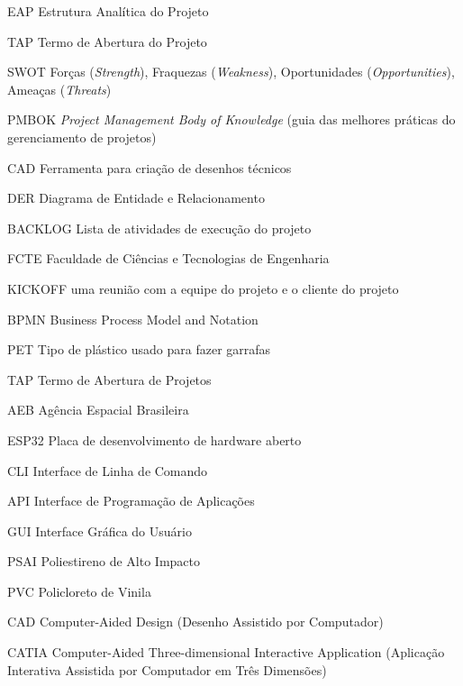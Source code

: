 \begin{siglas}
	\item[EAP] Estrutura Analítica do Projeto
	\item[TAP] Termo de Abertura do Projeto
	\item[SWOT] Forças (\textit{Strength}), Fraquezas (\textit{Weakness}), Oportunidades (\textit{Opportunities}), Ameaças (\textit{Threats})
	\item[PMBOK] \textit{Project Management Body of Knowledge} (guia das melhores práticas do gerenciamento de projetos)
	\item[CAD] Ferramenta para criação de desenhos técnicos
	\item[DER] Diagrama de Entidade e Relacionamento
	\item[BACKLOG] Lista de atividades de execução do projeto
	\item[FCTE] Faculdade de Ciências e Tecnologias de Engenharia
	\item[KICKOFF] uma reunião com a equipe do projeto e o cliente do projeto
	\item[BPMN] Business Process Model and Notation
	\item[PET] Tipo de plástico usado para fazer garrafas
	\item[TAP] Termo de Abertura de Projetos
	\item[AEB] Agência Espacial Brasileira
	\item[ESP32] Placa de desenvolvimento de hardware aberto
	\item[CLI] Interface de Linha de Comando
	\item[API] Interface de Programação de Aplicações
	\item[GUI] Interface Gráfica do Usuário
	\item[PSAI] Poliestireno de Alto Impacto
	\item[PVC] Policloreto de Vinila
	\item[CAD] Computer-Aided Design (Desenho Assistido por Computador)
	\item[CATIA] Computer-Aided Three-dimensional Interactive Application (Aplicação Interativa Assistida por Computador em Três Dimensões)
\end{siglas}
